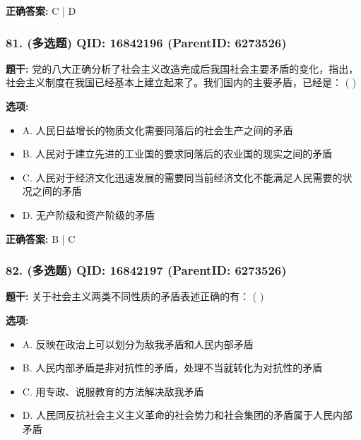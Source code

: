 \documentclass[12pt,UTF8]{ctexart}
\begin{document}
\textbf{正确答案:}
C | D

\vspace{0.3em}\hrulefill\vspace{0.7em}

\subsubsection*{81. (多选题) \small QID: 16842196 (ParentID: 6273526)}

\textbf{题干:}
党的八大正确分析了社会主义改造完成后我国社会主要矛盾的变化，指出，社会主义制度在我国已经基本上建立起来了。我们国内的主要矛盾，已经是： ( )



\textbf{选项:}
\begin{itemize}[leftmargin=*]

  \item A. 人民日益增长的物质文化需要同落后的社会生产之间的矛盾

  \item B. 人民对于建立先进的工业国的要求同落后的农业国的现实之间的矛盾

  \item C. 人民对于经济文化迅速发展的需要同当前经济文化不能满足人民需要的状况之间的矛盾

  \item D. 无产阶级和资产阶级的矛盾

\end{itemize}

\textbf{正确答案:}
B | C

\vspace{0.3em}\hrulefill\vspace{0.7em}

\subsubsection*{82. (多选题) \small QID: 16842197 (ParentID: 6273526)}

\textbf{题干:}
关于社会主义两类不同性质的矛盾表述正确的有： ( )



\textbf{选项:}
\begin{itemize}[leftmargin=*]

  \item A. 反映在政治上可以划分为敌我矛盾和人民内部矛盾

  \item B. 人民内部矛盾是非对抗性的矛盾，处理不当就转化为对抗性的矛盾

  \item C. 用专政、说服教育的方法解决敌我矛盾

  \item D. 人民同反抗社会主义主义革命的社会势力和社会集团的矛盾属于人民内部矛盾

\end{itemize}
\end{document}
